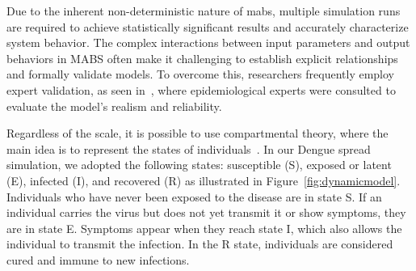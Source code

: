 Due to the inherent non-deterministic nature of \gls{mabs}, multiple simulation
runs are required to achieve statistically significant results and accurately
characterize system behavior. The complex interactions between input parameters
and output behaviors in MABS often make it challenging to establish explicit
relationships and formally validate models. To overcome this, researchers
frequently employ expert validation, as seen
in~\cite{amouroux:2008,damien:2017}, where epidemiological experts were
consulted to evaluate the model's realism and reliability.

Regardless of the scale, it is possible to use compartmental theory, where the
main idea is to represent the states of individuals~\citep{brauer-2008}. In our
Dengue spread simulation, we adopted the following states: susceptible (S),
exposed or latent (E), infected (I), and recovered (R) as illustrated in
Figure~\ref{fig:dynamicmodel}. Individuals who have never been exposed to the
disease are in state S. If an individual carries the virus but does not yet
transmit it or show symptoms, they are in state E. Symptoms appear when they
reach state I, which also allows the individual to transmit the infection. In
the R state, individuals are considered cured and immune to new infections.

